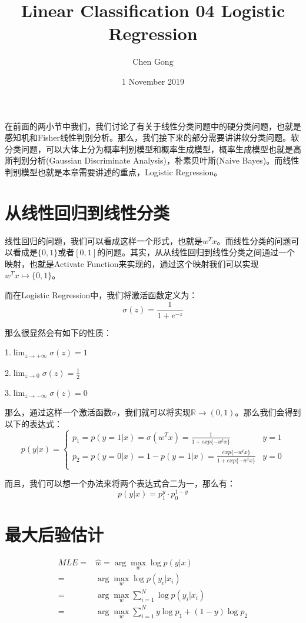 \documentclass[a4paper]{article}
\title{Linear Classification 04 Logistic Regression}
\author{Chen Gong}
\date{1 November 2019}
\begin{document}
\maketitle
在前面的两小节中我们，我们讨论了有关于线性分类问题中的硬分类问题，也就是感知机和Fisher线性判别分析。那么，我们接下来的部分需要讲讲软分类问题。软分类问题，可以大体上分为概率判别模型和概率生成模型，概率生成模型也就是高斯判别分析(Gaussian Discriminate Analysis)，朴素贝叶斯(Naive Bayes)。而线性判别模型也就是本章需要讲述的重点，Logistic Regression。

\section{从线性回归到线性分类}
线性回归的问题，我们可以看成这样一个形式，也就是$w^Tx$。而线性分类的问题可以看成是$\{0,1\}$或者$[0,1]$的问题。其实，从从线性回归到线性分类之间通过一个映射，也就是Activate Function来实现的，通过这个映射我们可以实现$w^Tx \longmapsto \{0,1\}$。

而在Logistic Regression中，我们将激活函数定义为：
\begin{equation}
    \sigma(z)=\frac{1}{1+e^{-z}}
\end{equation}

那么很显然会有如下的性质：

1.$\lim_{z\longrightarrow+\infty} \sigma(z) = 1$ 

2.$\lim_{z\longrightarrow 0 } \sigma(z) = \frac{1}{2}$

3.$\lim_{z\longrightarrow-\infty} \sigma(z) = 0$

那么，通过这样一个激活函数$\sigma$，我们就可以将实现$\mathbb{R}\longrightarrow (0,1)$。那么我们会得到以下的表达式：
\begin{equation}
    p(y|x) = 
    \left\{
        \begin{array}{ll}
        p_1=p(y=1|x)=\sigma(w^Tx)=\frac{1}{1+exp\{-w^tx\}} & y=1 \\
        p_2=p(y=0|x)=1-p(y=1|x)=\frac{exp\{-w^tx\}}{1+exp\{-w^tx\}} & y=0 \\
    \end{array}
    \right.
\end{equation}

而且，我们可以想一个办法来将两个表达式合二为一，那么有：
\begin{equation}
    p(y|x) = p_1^y\cdot p_0^{1-y}  
\end{equation}

\section{最大后验估计}
\begin{equation}
    \begin{split}
        MLE = & \hat{w} = \arg\max_w \log p(y|x) \\
            = & \arg\max_w \log p(y_i|x_i) \\
            = & \arg\max_w \sum_{i=1}^N \log p(y_i|x_i) \\
            = & \arg\max_w \sum_{i=1}^N y\log p_1 + (1-y)\log p_2 \\
    \end{split}
\end{equation}
    
\end{document}

